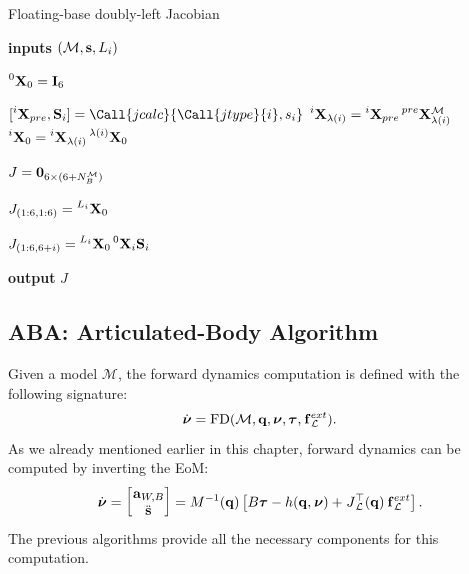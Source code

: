 \begin{algorithm}
\caption{Floating-base doubly-left Jacobian}
\label{algo:jacobian}
\begin{algorithmic}[1]
\small

\State \textbf{inputs} $\left(\mathcal{M}, \Shape, L_i\right)$

\State $\transvel[0]_0 = \eye_6$


    \State $[\transvel[i]_{pre}, \mathbf{S}_i] = \Call{jcalc}{\Call{jtype}{i}, s_i}$
    \State $\transvel[i]_{\lambda(i)} = \transvel[i]_{pre} \transvel[pre]_{\lambda(i)}^{\mathcal{M}}$
    \State $\transvel[i]_0 = \transvel[i]_{\lambda(i)} \transvel[\lambda(i)]_0$

\EndFor

\State $J = \zeros_{6 \times (6+N_B^{\mathcal{M}})}$

\State $J_{(1:6, 1:6)} = \transvel[L_i]_0$

        \State $J_{(1:6, 6+i)} = \transvel[L_i]_0 \transvel[0]_i \mathbf{S}_i$
    \EndIf
\EndFor

\State \textbf{output} $J$

\end{algorithmic}
\end{algorithm}

\subsection{ABA: Articulated-Body Algorithm}

Given a model $\mathcal{M}$, the forward dynamics computation is defined with the following signature:
%
\begin{equation*}
    \dot{\boldsymbol{\nu}} = \operatorname{FD}(\mathcal{M}, \mathbf{q}, \boldsymbol{\nu}, \boldsymbol{\tau}, \forcesix^{ext}_\mathcal{L})
    .
\end{equation*}
%
As we already mentioned earlier in this chapter, forward dynamics can be computed by inverting the \ac{EoM}:
%
\begin{equation*}
    \Nud =
    \begin{bmatrix}
        \accsix_{W,B} \\ \Shapedd
    \end{bmatrix} =
    M^{-1}(\Qu) \left[ B \Torques - h(\Qu, \Nu) + \jac_\mathcal{L}^\top(\Qu) \forcesix^{ext}_\mathcal{L} \right]
    .
\end{equation*}
%
The previous algorithms provide all the necessary components for this computation.


